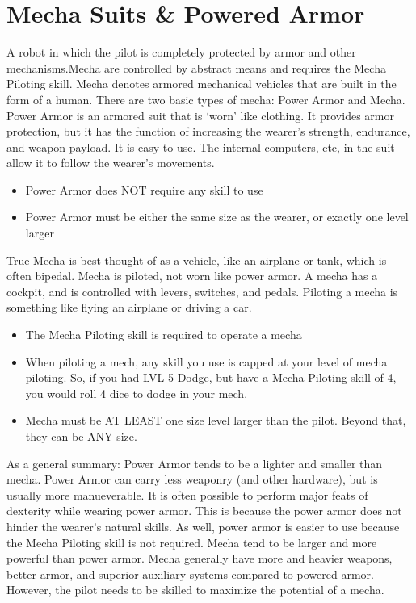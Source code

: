 \documentclass[twoside]{book}
\begin{document}
\section{Mecha Suits \& Powered Armor}
      A robot in which the pilot is completely protected by
             armor and other mechanisms.Mecha are controlled by abstract
             means and requires the Mecha Piloting skill.   Mecha denotes armored mechanical vehicles that are
             built in the form of a human. There are two basic types of
             mecha: Power Armor and Mecha.   Power Armor is an armored suit that is
             `worn' like clothing. It provides armor
             protection, but it has the function of increasing the
             wearer's strength, endurance, and weapon payload. It
             is easy to use. The internal computers, etc, in the suit
             allow it to follow the wearer's movements. 
\begin{itemize}
      
  \item  Power Armor does NOT require any skill to use
               
  \item  Power Armor must be either the same size as the
               wearer, or exactly one level larger 
\end{itemize}
    True Mecha is best thought of as a vehicle, like an
             airplane or tank, which is often bipedal. Mecha is piloted,
             not worn like power armor. A mecha has a cockpit, and is
             controlled with levers, switches, and pedals. Piloting a
             mecha is something like flying an airplane or driving a car.
             
\begin{itemize}
      
  \item  The Mecha Piloting skill is required to operate a
               mecha 
  \item  When piloting a mech, any skill you use is capped at
               your level of mecha piloting. So, if you had LVL 5 Dodge,
               but have a Mecha Piloting skill of 4, you would roll 4
               dice to dodge in your mech. 
  \item  Mecha must be AT LEAST one size level larger than
               the pilot. Beyond that, they can be ANY size. 
\end{itemize}
    As a general summary: Power Armor tends to be a
             lighter and smaller than mecha. Power Armor can carry less
             weaponry (and other hardware), but is usually more
             manueverable. It is often possible to perform major feats of
             dexterity while wearing power armor. This is because the
             power armor does not hinder the wearer's natural
             skills. As well, power armor is easier to use because the
             Mecha Piloting skill is not required.   Mecha tend to be larger and more powerful than power
             armor. Mecha generally have more and heavier weapons, better
             armor, and superior auxiliary systems compared to powered
             armor. However, the pilot needs to be skilled to maximize
             the potential of a mecha. 
    
\end{document}
